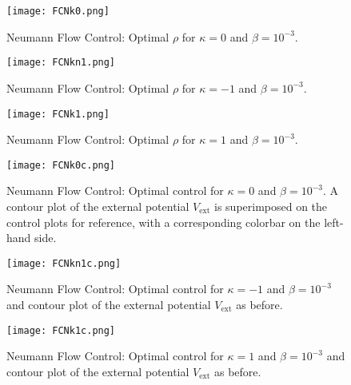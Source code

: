 
\begin{figure}[h]
	\centering
	\texttt{[image: FCNk0.png]}
	\caption{Neumann Flow Control: Optimal $\rho$ for $\kappa = 0$ and $\beta = 10^{-3}$.} 
	\label{F3a}
\end{figure}
\begin{figure}[h]
	\centering
	\texttt{[image: FCNkn1.png]}
	\caption{Neumann Flow Control: Optimal $\rho$ for $\kappa = -1$ and $\beta = 10^{-3}$.} 
	\label{F3b}
\end{figure}
\begin{figure}[h]
	\centering
	\texttt{[image: FCNk1.png]}
	\caption{Neumann Flow Control: Optimal $\rho$ for $\kappa = 1$ and $\beta = 10^{-3}$.} 
	\label{F3c}
\end{figure}


\begin{figure}[h]
	\centering
	\texttt{[image: FCNk0c.png]}
	\caption{Neumann Flow Control: Optimal control for $\kappa = 0$ and $\beta = 10^{-3}$. A contour plot of the external potential \emph{$V_{\text{ext}}$} is superimposed on the control plots for reference, with a corresponding colorbar on the left-hand side.} 
	\label{F3ac}
\end{figure}
\begin{figure}[h]
	\centering
	\texttt{[image: FCNkn1c.png]}
	\caption{Neumann Flow Control: Optimal control for $\kappa = -1$ and $\beta = 10^{-3}$ and contour plot of the external potential \emph{$V_{\text{ext}}$} as before.} 
	\label{F3bc}
\end{figure}
\begin{figure}[h]
	\centering
	\texttt{[image: FCNk1c.png]}
	\caption{Neumann Flow Control: Optimal control for $\kappa = 1$ and $\beta = 10^{-3}$ and contour plot of the external potential \emph{$V_{\text{ext}}$} as before.} 
	\label{F3cc}
\end{figure}

